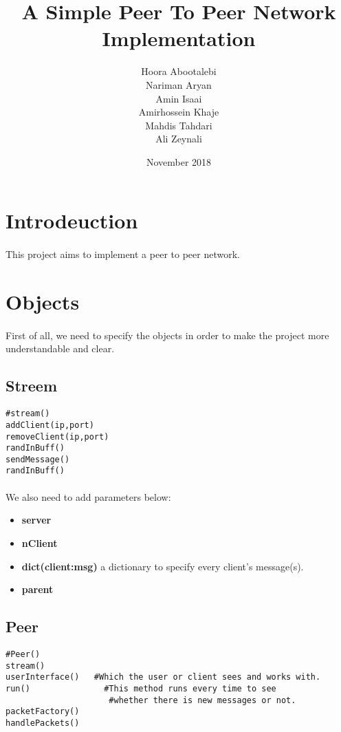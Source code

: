 \documentclass{article}
\title{A Simple Peer To Peer Network Implementation}
\author{Hoora Abootalebi\\Nariman Aryan\\Amin Isaai\\Amirhossein Khaje\\Mahdis Tahdari\\Ali Zeynali}
\date{ November 2018}
\begin{document}
\large
\maketitle
\clearpage
\tableofcontents
\clearpage
\section{Introdeuction}
\paragraph{}This project aims to implement a peer to peer network.
\section{Objects}
\paragraph{}First of all, we need to specify the objects in order to make the project more understandable and clear.
\subsection{Streem}
\begin{lstlisting}
#stream()
addClient(ip,port)
removeClient(ip,port)
randInBuff()
sendMessage()
randInBuff()
\end{lstlisting}
\paragraph{}We also need to add parameters below:
\begin{itemize}
    \item \textbf{server}
    \item \textbf{nClient}
    \item \textbf{dict(client:msg)} a dictionary to specify every client's message(s). 
    \item \textbf{parent}
\end{itemize}
\subsection{Peer}
\begin{lstlisting}
#Peer()
stream()
userInterface()   #Which the user or client sees and works with. 
run() 				#This method runs every time to see 
				     #whether there is new messages or not.
packetFactory()
handlePackets()
\end{lstlisting}
\end{document}
